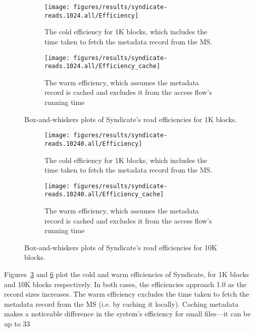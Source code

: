 \begin{figure}[htp!]
   \centering
   \begin{subfigure}[b]{.8\textwidth}
      \texttt{[image: figures/results/syndicate-reads.1024.all/Efficiency]}
      \label{fig:syndicate-cold-efficiency-1k}
      \caption{The cold efficiency for 1K blocks, which includes the time taken to fetch the
      metadata record from the MS.}
   \end{subfigure}
   \begin{subfigure}[b]{.8\textwidth}
      \texttt{[image: figures/results/syndicate-reads.1024.all/Efficiency\_cache]}
      \label{fig:syndicate-warm-efficiency-1k}
      \caption{The warm efficiency, which assumes the metadata record is cached
      and excludes it from the access flow's running time}
   \end{subfigure}
   \caption{Box-and-whiskers plots of Syndicate's read efficiencies for 1K blocks.}
   \label{fig:syndicate-read-efficiencies-1k}
\end{figure}

\begin{figure}[htp!]
   \centering
   \begin{subfigure}[b]{.8\textwidth}
      \texttt{[image: figures/results/syndicate-reads.10240.all/Efficiency]}
      \label{fig:syndicate-cold-efficiency-10k}
      \caption{The cold efficiency for 1K blocks, which includes the time taken to fetch the
      metadata record from the MS.}
   \end{subfigure}
   \begin{subfigure}[b]{.8\textwidth}
      \texttt{[image: figures/results/syndicate-reads.10240.all/Efficiency\_cache]}
      \label{fig:syndicate-warm-efficiency-10k}
      \caption{The warm efficiency, which assumes the metadata record is cached
      and excludes it from the access flow's running time}
   \end{subfigure}
   \caption{Box-and-whiskers plots of Syndicate's read efficiencies for 10K blocks.}
   \label{fig:syndicate-read-efficiencies-10k}
\end{figure}

Figures~\ref{fig:syndicate-read-efficiencies-1k} and
\ref{fig:syndicate-read-efficiencies-10k} plot the cold and warm efficiencies of
Syndicate, for 1K blocks and 10K blocks respectively.  In both cases, the
efficiencies approach 1.0 as the record sizes increases.  The warm efficiency
excludes the time taken to fetch the metadata record from the MS (i.e. by
caching it locally).  Caching metadata makes a noticeable difference in the
system's efficiency for small files---it can be up to 33%

